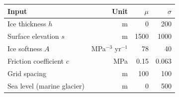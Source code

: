 \begin{tabular*}{\linewidth}{@{\extracolsep{\fill}}lrrr@{}}
\toprule
Input & Unit & $\mu$ & $\sigma$\\
\midrule
Ice thickness $h$ & m & 0 & 200 \\
Surface elevation $s$ & m & 1500 & 1000 \\
Ice softness $A$ & MPa$^{-3}$ yr$^{-1}$ & 78 & 40 \\
Friction coefficient $c$ & MPa & 0.15 & 0.063 \\
Grid spacing & m & 100 & 100 \\
Sea level (marine glacier) & m & 0 & 500 \\
\bottomrule
\end{tabular*}
